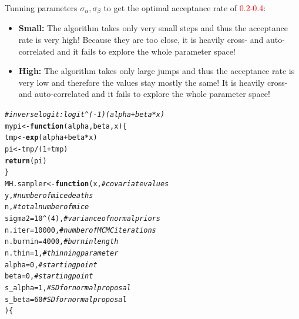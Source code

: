 \documentclass{article}\usepackage[]{graphicx}\usepackage[]{xcolor}
\makeatletter
\newcommand{\hlnum}[1]{\textcolor[rgb]{0.686,0.059,0.569}{#1}}%
\newcommand{\hlcom}[1]{\textcolor[rgb]{0.678,0.584,0.686}{\textit{#1}}}%
\newcommand{\hlopt}[1]{\textcolor[rgb]{0,0,0}{#1}}%
\newcommand{\hlstd}[1]{\textcolor[rgb]{0.345,0.345,0.345}{#1}}%
\newcommand{\hlkwa}[1]{\textcolor[rgb]{0.161,0.373,0.58}{\textbf{#1}}}%
\newcommand{\hlkwb}[1]{\textcolor[rgb]{0.69,0.353,0.396}{#1}}%
\newcommand{\hlkwc}[1]{\textcolor[rgb]{0.333,0.667,0.333}{#1}}%
\newcommand{\hlkwd}[1]{\textcolor[rgb]{0.737,0.353,0.396}{\textbf{#1}}}%
\newenvironment{kframe}{%
 \def\at@end@of@kframe{}%
 \ifinner\ifhmode%
  \def\at@end@of@kframe{\end{minipage}}%
  \begin{minipage}{\columnwidth}%
 \fi\fi%
 \def\FrameCommand##1{\hskip\@totalleftmargin \hskip-\fboxsep
 \colorbox{shadecolor}{##1}\hskip-\fboxsep
     \hskip-\linewidth \hskip-\@totalleftmargin \hskip\columnwidth}%
 \MakeFramed {\advance\hsize-\width
   \@totalleftmargin\z@ \linewidth\hsize
   \@setminipage}}%
 {\par\unskip\endMakeFramed%
 \at@end@of@kframe}
\newenvironment{knitrout}{}{} %
\makeatother
\begin{document}
\begin{multicols*}{2}
Tunning parameters $\sigma_{\alpha},\sigma_{\beta}$ to get the optimal acceptance rate of \textcolor{red}{0.2-0.4}:
\begin{itemize}
\item \textbf{Small:} The algorithm takes only very small steps and thus the acceptance rate is very high! Because they are too close, it is heavily cross- and auto-correlated and it fails to explore the whole parameter space!
\item \textbf{High:} The algorithm takes only large jumps and thus the acceptance rate is very low and therefore the values stay mostly the same! It is heavily cross- and auto-correlated and it fails to explore the whole parameter space!
\end{itemize}
\tiny
\begin{knitrout}
\color{fgcolor}\begin{kframe}
\begin{alltt}
\hlcom{# inverse logit: logit^(-1)(alpha + beta*x)}
\hlstd{mypi} \hlkwb{<-} \hlkwa{function}\hlstd{(}\hlkwc{alpha}\hlstd{,} \hlkwc{beta}\hlstd{,} \hlkwc{x}\hlstd{)\{}
  \hlstd{tmp} \hlkwb{<-} \hlkwd{exp}\hlstd{(alpha} \hlopt{+} \hlstd{beta}\hlopt{*}\hlstd{x)}
  \hlstd{pi} \hlkwb{<-} \hlstd{tmp}\hlopt{/}\hlstd{(}\hlnum{1}\hlopt{+}\hlstd{tmp)}
  \hlkwd{return}\hlstd{(pi)}
\hlstd{\}}
\hlstd{MH.sampler} \hlkwb{<-} \hlkwa{function}\hlstd{(}\hlkwc{x}\hlstd{,}               \hlcom{# covariate values}
                       \hlkwc{y}\hlstd{,}               \hlcom{# number of mice deaths}
                       \hlkwc{n}\hlstd{,}               \hlcom{# total number of mice}
                       \hlkwc{sigma2} \hlstd{=} \hlnum{10}\hlopt{^}\hlstd{(}\hlnum{4}\hlstd{),} \hlcom{# variance of normal priors}
                       \hlkwc{n.iter} \hlstd{=} \hlnum{10000}\hlstd{,}  \hlcom{# number of MCMC iterations}
                       \hlkwc{n.burnin} \hlstd{=} \hlnum{4000}\hlstd{,} \hlcom{# burnin length}
                       \hlkwc{n.thin} \hlstd{=} \hlnum{1}\hlstd{,}      \hlcom{# thinning parameter}
                       \hlkwc{alpha} \hlstd{=} \hlnum{0}\hlstd{,}       \hlcom{# starting point}
                       \hlkwc{beta} \hlstd{=} \hlnum{0}\hlstd{,}        \hlcom{# starting point}
                       \hlkwc{s_alpha} \hlstd{=} \hlnum{1}\hlstd{,}     \hlcom{# SD for normal proposal}
                       \hlkwc{s_beta} \hlstd{=} \hlnum{60}      \hlcom{# SD for normal proposal}
                       \hlstd{) \{}


\end{alltt}
\end{kframe}
\end{knitrout}
\end{multicols*}
\end{document}
